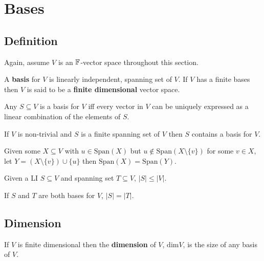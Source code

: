 \documentclass[../Year1/Year1.tex]{subfiles}
\begin{document}
\section{Bases}

\subsection{Definition}
Again, assume $V$ is an $\mathbb{F}$-vector space throughout this section.
\begin{definition}[Bases]
    A \textbf{basis} for $V$ is linearly independent, spanning set of $V$. If $V$ has a finite bases then $V$ is said to be a \textbf{finite dimensional} vector space.
\end{definition}

\begin{theorem}
    Any $S\subseteq V$ is a basis for $V$ iff every vector in $V$ can be uniquely expressed as a linear combination of the elements of $S$.
\end{theorem}

\begin{theorem}
    If $V$ is non-trivial and $S$ is a finite spanning set of $V$ then $S$ contains a basis for $V$.
\end{theorem}

\begin{lemma}
    Given some $X\subseteq V$ with $u\in \text{Span}(X)$ but $u\not\in \text{Span}(X\setminus \{v\})$ for some $v\in X$, let $Y=(X\setminus \{v\})\cup \{u\}$ then $\text{Span}(X) = \text{Span}(Y)$.
\end{lemma}

\begin{theorem}
    Given a LI $S\subseteq V$ and spanning set $T\subseteq V$, $|S|\leq|V|$.
\end{theorem}

\begin{corollary}
    If $S$ and $T$ are both bases for $V$, $|S|=|T|$.
\end{corollary}

\subsection{Dimension}

\begin{definition}
    If $V$ is finite dimensional then the \textbf{dimension} of $V$, $\text{dim}V$, is the size of any basis of $V$.
\end{definition}
\end{document}
